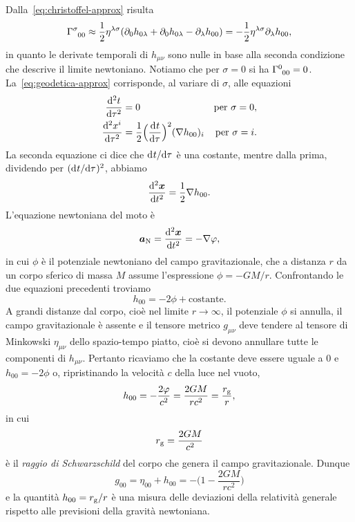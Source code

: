 Dalla~\eqref{eq:christoffel-approx} risulta
\begin{equation}
  \tensor{\Gamma}{^{\sigma}_{00}} \approx
  \frac{1}{2}\eta^{\lambda\sigma}(\partial_{0}h_{0\lambda}
  + \partial_{0}h_{0\lambda} - \partial_{\lambda}h_{00}) =
  -\frac{1}{2}\eta^{\lambda\sigma} \partial_{\lambda}h_{00},
\end{equation}
in quanto le derivate temporali di $h_{\mu\nu}$ sono nulle in base alla seconda
condizione che descrive il limite newtoniano.  Notiamo che per $\sigma=0$ si ha
$\tensor{\Gamma}{^{0}_{00}}=0$.  La~\eqref{eq:geodetica-approx} corrisponde, al
variare di $\sigma$, alle equazioni
\begin{subequations}
  \begin{align}
    \toder[2]{t}{\tau} &= 0 &\text{per $\sigma = 0$}, \\
    \toder[2]{x^{i}}{\tau} &= \frac{1}{2} \Big( \toder{t}{\tau} \Big)^{2}
    (\nabla h_{00})_{i} &\text{per $\sigma = i$}.
  \end{align}
\end{subequations}
La seconda equazione ci dice che $\ltoder{t}{\tau}$ è una costante, mentre dalla
prima, dividendo per $(\ltoder{t}{\tau})^{2}$, abbiamo
\begin{equation}
  \toder[2]{\bm{x}}{t} = \frac{1}{2}\nabla h_{00}.
\end{equation}
L'equazione newtoniana del moto è
\begin{equation}
  \bm{a}_{\textup{N}} = \toder[2]{\bm{x}}{t} = -\nabla\phi,
\end{equation}
in cui $\phi$ è il potenziale newtoniano del campo gravitazionale, che a
distanza $r$ da un corpo sferico di massa $M$ assume l'espressione
$\phi = -GM/r$.  Confrontando le due equazioni precedenti troviamo
\begin{equation}
  h_{00} = -2\phi + \text{costante}.
\end{equation}
A grandi distanze dal corpo, cioè nel limite $r \to \infty$, il potenziale
$\phi$ si annulla, il campo gravitazionale è assente e il tensore metrico
$g_{\mu\nu}$ deve tendere al tensore di Minkowski $\eta_{\mu\nu}$ dello
spazio-tempo piatto, cioè si devono annullare tutte le componenti di
$h_{\mu\nu}$.  Pertanto ricaviamo che la costante deve essere uguale a $0$ e
$h_{00} = -2\phi$ o, ripristinando la velocità $c$ della luce  nel vuoto,
\begin{equation}
  h_{00} = -\frac{2\phi}{c^{2}} = \frac{2GM}{rc^{2}} = \frac{r_{\textup{g}}}{r},
\end{equation}
in cui
\begin{equation}
  r_{\textup{g}} = \frac{2GM}{c^{2}}
\end{equation}
è il \emph{raggio di Schwarzschild} del corpo che
genera il campo gravitazionale.  Dunque
\begin{equation}
  g_{00} = \eta_{00} + h_{00} = - \Big(1 - \frac{2GM}{rc^{2}} \Big)
\end{equation}
e la quantità $h_{00} = r_{\textup{g}}/r$ è una misura delle deviazioni della
relatività generale rispetto alle previsioni della gravità newtoniana.

